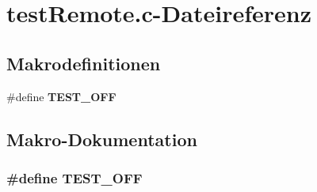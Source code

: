 \section{testRemote.c-\/Dateireferenz}
\label{test_remote_8c}
\subsection*{Makrodefinitionen}
\begin{DoxyCompactItemize}
\item 
\#define {\bf TEST\_\-OFF}
\end{DoxyCompactItemize}


\subsection{Makro-\/Dokumentation}
\subsubsection[{TEST\_\-OFF}]{\setlength{\rightskip}{0pt plus 5cm}\#define TEST\_\-OFF}\label{test_remote_8c_a8f6764e8e57eabbb14922404c0e25175}

